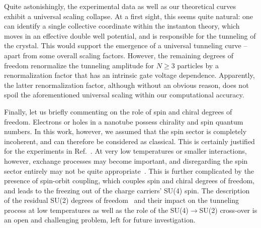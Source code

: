 \documentclass[aps, prb, floatfix, twocolumn, notitlepage, superscriptaddress, 10pt]{revtex4-2}
\newcommand{\1}{{1\hspace*{-0.5ex} \textrm{l} \hspace*{0.5ex}}}
\begin{document}
Quite astonishingly, the experimental data as well as  our theoretical curves   exhibit a universal 
scaling collapse.  At a first sight, this seems quite natural: one can identify a single collective coordinate 
within the instanton theory, which moves in an effective double well potential, 
and is responsible for the tunneling of the crystal. This would support the emergence of
a universal tunneling curve – apart from some overall scaling factors. However,  the remaining 
degrees of freedom  renormalize the tunneling amplitude for $N\ge 3$ particles
by a renormalization factor that has an intrinsic gate voltage dependence.  Apparently, the latter 
renormalization factor, although without an obvious reason,  does not spoil the 
aforementioned universal scaling within  our computational accuracy. 


Finally, let us  briefly commenting  on  the role of 
spin and chiral degrees of freedom. Electrons or holes in a nanotube 
 possess chirality and spin quantum numbers. 
In this work, however, we assumed that the spin sector is completely incoherent, and can therefore be 
considered as classical. This is certainly justified for the experiments in Ref.~\cite{Shapir.2019}. 
At very low temperatures or smaller interactions, however,  exchange processes 
may become important, and disregarding the spin sector entirely may not  be  quite appropriate~\cite{FieteBalents2004,Fiete2007}. 
This is further complicated by the presence of spin-orbit coupling, which couples spin 
and chiral degrees of freedom, and leads to the freezing out of the charge carriers' SU(4) spin.  
The description of the residual SU(2) degrees  of freedom~\cite{Sarkany.2017}  and their impact 
on the tunneling process at low temperatures  as well as the role of the  SU(4)$\to$SU(2) cross-over 
is an open and challenging problem, left for future investigation. 
\end{document}
